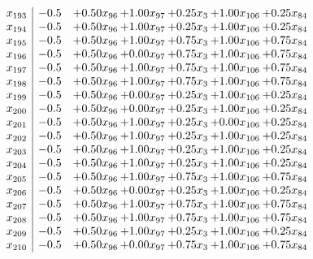 \documentclass[8pt]{article}
\begin{document}
\[\begin{array}{c| c c@{\hskip 2pt} c@{\hskip 2pt} c@{\hskip 2pt} c@{\hskip 2pt} c@{\hskip 2pt} }
 x_{193}   &  -0.5 & +  0.50 x_{96} & +  1.00 x_{97} & +  0.25 x_{3} & +  1.00 x_{106} & +  0.25 x_{84}\\
 x_{194}   &  -0.5 & +  0.50 x_{96} & +  1.00 x_{97} & +  0.25 x_{3} & +  1.00 x_{106} & +  0.25 x_{84}\\
 x_{195}   &  -0.5 & +  0.50 x_{96} & +  1.00 x_{97} & +  0.75 x_{3} & +  1.00 x_{106} & +  0.75 x_{84}\\
 x_{196}   &  -0.5 & +  0.50 x_{96} & +  0.00 x_{97} & +  0.75 x_{3} & +  1.00 x_{106} & +  0.75 x_{84}\\
 x_{197}   &  -0.5 & +  0.50 x_{96} & +  1.00 x_{97} & +  0.75 x_{3} & +  1.00 x_{106} & +  0.75 x_{84}\\
 x_{198}   &  -0.5 & +  0.50 x_{96} & +  1.00 x_{97} & +  0.75 x_{3} & +  1.00 x_{106} & +  0.75 x_{84}\\
 x_{199}   &  -0.5 & +  0.50 x_{96} & +  0.00 x_{97} & +  0.25 x_{3} & +  1.00 x_{106} & +  0.25 x_{84}\\
 x_{200}   &  -0.5 & +  0.50 x_{96} & +  0.00 x_{97} & +  0.25 x_{3} & +  1.00 x_{106} & +  0.25 x_{84}\\
 x_{201}   &  -0.5 & +  0.50 x_{96} & +  1.00 x_{97} & +  0.25 x_{3} & +  0.00 x_{106} & +  0.25 x_{84}\\
 x_{202}   &  -0.5 & +  0.50 x_{96} & +  1.00 x_{97} & +  0.25 x_{3} & +  1.00 x_{106} & +  0.25 x_{84}\\
 x_{203}   &  -0.5 & +  0.50 x_{96} & +  1.00 x_{97} & +  0.25 x_{3} & +  1.00 x_{106} & +  0.25 x_{84}\\
 x_{204}   &  -0.5 & +  0.50 x_{96} & +  1.00 x_{97} & +  0.25 x_{3} & +  1.00 x_{106} & +  0.25 x_{84}\\
 x_{205}   &  -0.5 & +  0.50 x_{96} & +  1.00 x_{97} & +  0.75 x_{3} & +  1.00 x_{106} & +  0.75 x_{84}\\
 x_{206}   &  -0.5 & +  0.50 x_{96} & +  0.00 x_{97} & +  0.25 x_{3} & +  1.00 x_{106} & +  0.25 x_{84}\\
 x_{207}   &  -0.5 & +  0.50 x_{96} & +  1.00 x_{97} & +  0.75 x_{3} & +  1.00 x_{106} & +  0.75 x_{84}\\
 x_{208}   &  -0.5 & +  0.50 x_{96} & +  1.00 x_{97} & +  0.75 x_{3} & +  1.00 x_{106} & +  0.75 x_{84}\\
 x_{209}   &  -0.5 & +  0.50 x_{96} & +  1.00 x_{97} & +  0.25 x_{3} & +  1.00 x_{106} & +  0.25 x_{84}\\
 x_{210}   &  -0.5 & +  0.50 x_{96} & +  0.00 x_{97} & +  0.75 x_{3} & +  1.00 x_{106} & +  0.75 x_{84}\\

\end{array}\]
\end{document}
